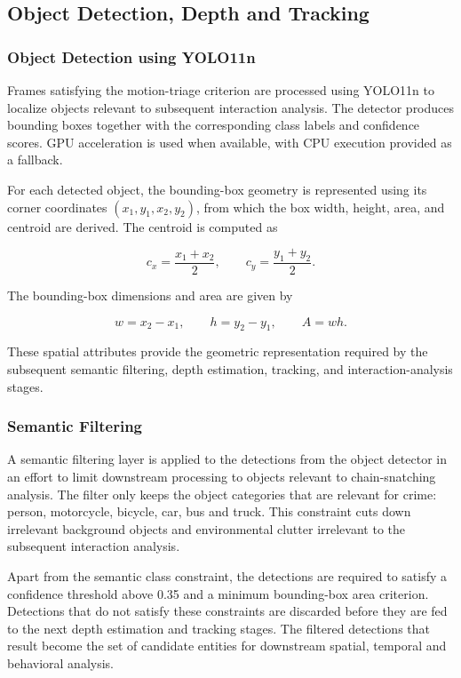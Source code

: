 \documentclass[conference]{IEEEtran}
\begin{document}
\subsection{Object Detection, Depth and Tracking}

\subsubsection{Object Detection using YOLO11n}

Frames satisfying the motion-triage criterion are processed using
YOLO11n \cite{yolov11} to localize objects relevant to subsequent interaction analysis.
The detector produces bounding boxes together with the corresponding
class labels and confidence scores. GPU acceleration is used when
available, with CPU execution provided as a fallback.

For each detected object, the bounding-box geometry is represented using
its corner coordinates $(x_1,y_1,x_2,y_2)$, from which the box width,
height, area, and centroid are derived. The centroid is computed as

\begin{equation}
c_x = \frac{x_1+x_2}{2}, \qquad
c_y = \frac{y_1+y_2}{2}.
\end{equation}

The bounding-box dimensions and area are given by

\begin{equation}
w=x_2-x_1,\qquad
h=y_2-y_1,\qquad
A=w h.
\end{equation}

These spatial attributes provide the geometric representation required
by the subsequent semantic filtering, depth estimation, tracking, and
interaction-analysis stages.

\subsubsection{Semantic Filtering}

A semantic filtering layer is applied to the detections from the object detector in an effort to limit downstream processing to objects relevant to chain-snatching analysis. The filter only keeps the object categories that are relevant for crime: person, motorcycle, bicycle, car, bus and truck. This constraint cuts down irrelevant background objects and environmental clutter irrelevant to the subsequent interaction analysis.

Apart from the semantic class constraint, the detections are required to satisfy a confidence threshold above 0.35 and a minimum bounding-box area criterion. Detections that do not satisfy these constraints are discarded before they are fed to the next depth estimation and tracking stages. The filtered detections that result become the set of candidate entities for downstream spatial, temporal and behavioral analysis.
\end{document}
